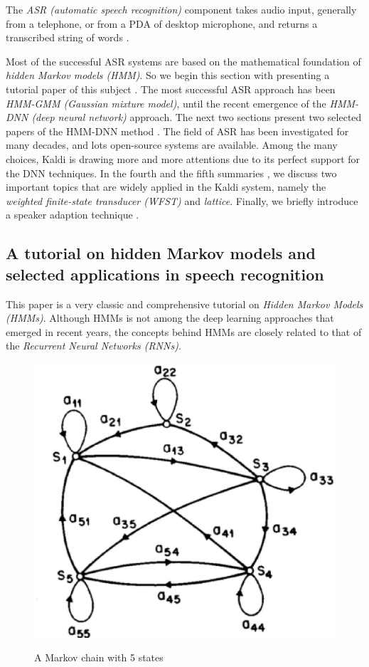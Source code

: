 \documentclass[paper=a4, fontsize=18pt]{article} %
\numberwithin{equation}{section} %
\numberwithin{figure}{section} %
\numberwithin{table}{section} %
\begin{document}
The \emph{ASR (automatic speech recognition)} component takes audio input, generally from a telephone, or from a PDA of desktop microphone, and returns a transcribed string of words \cite{Jurafsky2006}.

Most of the successful ASR systems are based on the mathematical foundation of \emph{hidden Markov models (HMM)}. So we begin this section with presenting a tutorial paper of this subject \cite{Rabiner1989A}. The most successful ASR approach has been \emph{HMM-GMM (Gaussian mixture model)}, until the recent emergence of the \emph{HMM-DNN (deep neural network)} approach. The next two sections present two selected papers of the HMM-DNN method \cite{Hinton2012Deep,Graves2013Speech}. The field of ASR has been investigated for many decades, and lots open-source systems are available. Among the many choices, Kaldi \cite{DanielPovey2014} is drawing more and more attentions due to its perfect support for the DNN techniques. In the fourth and the fifth summaries \cite{Mohri2000,Ljolje1999}, we discuss two important topics that are widely applied in the Kaldi system, namely the \emph{weighted finite-state transducer (WFST)} and \emph{lattice}. Finally, we briefly introduce a speaker adaption technique \cite{Leggetter1995}.

\subsection{A tutorial on hidden Markov models and selected applications in speech recognition \cite{Rabiner1989A}}

This paper is a very classic and comprehensive tutorial on \emph{Hidden Markov Models (HMMs)}. Although HMMs is not among the deep learning approaches that emerged in recent years, the concepts behind HMMs are closely related to that of the \emph{Recurrent Neural Networks (RNNs)}.

\begin{figure}[htbp]
  \centering
  \includegraphics[width=.6\linewidth]{8_29_HMM_chain}\\
  \caption{A Markov chain with 5 states}\label{fig:chain}
\end{figure}
\end{document}

